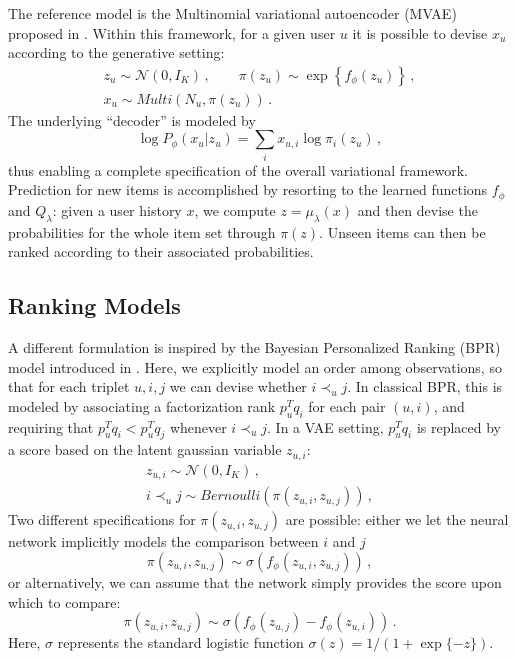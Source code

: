 \documentclass[sigconf]{acmart}
\newcommand{\bs}[1]{\ensuremath{\bm{\mathit{#1}}}}
\numberwithin{equation}{section}
\begin{document}
The reference model is the Multinomial variational autoencoder (MVAE)
proposed in \cite{Liang:2018:VAC:3178876.3186150}. Within this
framework, for a given user $u$ it is possible to devise $\bs{x}_u$
according to the generative setting:
\begin{equation}
\begin{gathered}
\bs{z}_u \sim \mathcal{N}(\bs{0}, \bs{I}_K) \, , \qquad  \pi(\bs{z}_u)
\sim \exp\left\{f_\phi(\bs{z}_u)\right\} \, , \\
 \bs{x}_u \sim \mathit{Multi}\left(N_u,\pi(\bs{z}_u)\right) \, .
\end{gathered}
\end{equation}
The underlying ``decoder'' is modeled by 
$$
\log P_\phi(\bs{x}_u |\bs{z}_u) = \sum_i x_{u,i} \log \pi_i(\bs{z}_u) \, , 
$$
thus enabling a complete specification of the overall variational
framework. Prediction for new items is accomplished by resorting to
the learned functions $f_\phi$ and $Q_\lambda$: given a user history
$\bs{x}$, we compute $\bs{z} = \bs{\mu}_\lambda(\bs{x})$ and then
devise the probabilities for the whole item set through
$\pi(\bs{z})$. Unseen items can then be ranked according to
their associated probabilities.  



\subsection{Ranking Models}
\label{sec:bpr}

A different formulation is inspired by the Bayesian Personalized Ranking
(BPR) model introduced in
\cite{Rendle:2009}. Here, we explicitly model an
order among observations, so that for each triplet $u,i,j$ we can
devise whether $i \prec_u j$. In classical BPR, this is modeled
by associating a factorization rank $\bs{p}^T_u \bs{q}_i$ for each
pair $(u,i)$, and requiring that $\bs{p}^T_u \bs{q}_i < \bs{p}^T_u
\bs{q}_j$ whenever $i \prec_u j$. In a VAE setting, $\bs{p}^T_u
\bs{q}_i$ is replaced by a score based on the latent gaussian variable
$\bs{z}_{u,i}$: 
\begin{equation}
\begin{gathered}
\bs{z}_{u,i} \sim \mathcal{N}(\bs{0}, \bs{I}_K) \, ,\\
i \prec_u j \sim \mathit{Bernoulli}\left(\pi(\bs{z}_{u,i},
   \bs{z}_{u,j})\right) \, ,
\end{gathered}
\end{equation} 
Two different specifications for $\pi(\bs{z}_{u,i}, \bs{z}_{u,j})$ are
possible: either we let the neural network implicitly models the
comparison between $i$ and $j$
\begin{equation}\label{eq:rvaep}
\pi(\bs{z}_{u,i}, \bs{z}_{u,j})
\sim \sigma\left(f_\phi(\bs{z}_{u,i}, \bs{z}_{u,j})\right) \, ,
\end{equation}
or alternatively, we can assume that the network simply provides the
score upon which to compare: 
\begin{equation}\label{eq:rvaed}
\pi(\bs{z}_{u,i}, \bs{z}_{u,j})
\sim \sigma\left(f_\phi(\bs{z}_{u,j}) -  f_\phi(\bs{z}_{u,i})\right) \, .
\end{equation}
Here, $\sigma$ represents the standard logistic function $\sigma(z) =
1/(1+\exp\{-z\})$.
\end{document}
